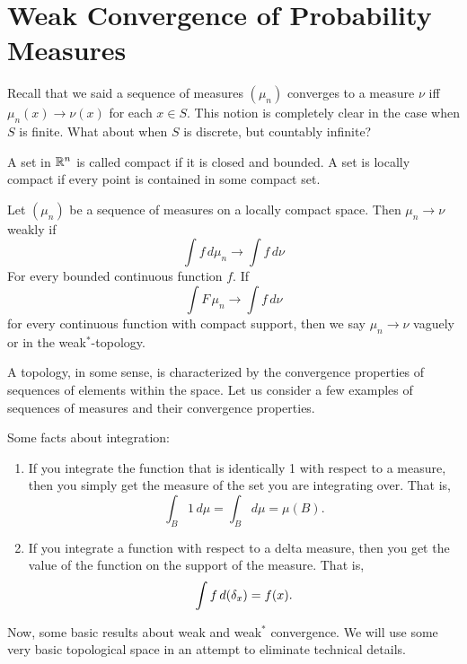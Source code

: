 

\section{Weak Convergence of Probability Measures}
\label{organized:weak-convergence}


Recall that we said a sequence of measures $(\mu_n)$ converges to
a measure $\nu$ if{f} $\mu_n(x) \to \nu(x)$ for each $x \in S$.  
This notion is completely clear in the case when $S$ is finite.  What about when $S$ is discrete, but countably infinite?

\begin{definition}   \label{defn:3.4}
A set in $\mathbb{R}^n$ is called compact if it is closed and bounded.  
A set is locally compact if every point is contained in some compact set.
\end{definition}

\begin{definition}   \label{defn:3.5}
Let $(\mu_n)$ be a sequence of measures on a locally compact space.  
Then $\mu_n \to \nu$ weakly if
\[
     \int f\, d\mu_n \to \int f\, d\nu
\]
For every bounded continuous function $f$.  If
\[
     \int F\, \mu_n \to \int f\, d\nu
\]
for every continuous function with compact support, then we say $\mu_n \to \nu$ vaguely or in the weak$^*$-topology.
\end{definition}

A topology, in some sense, is characterized by the convergence
properties of sequences of elements within the space.  
Let us consider a few examples of sequences of measures and their convergence properties.

Some facts about integration:
\begin{enumerate}
\item[(1)] If you integrate the function that is identically 1 with
     respect to a measure, then you simply get the measure of the set
     you are integrating over.  That is,
\[
     \int_B 1\, d\mu = \int_B d\mu = \mu(B).
\]

\item[(2)] If you integrate a function with respect to a delta measure, then you get the value of the function on the support of the measure.  
That is,
\[
     \int f\, d(\delta_x) = f(x).
\]
\end{enumerate}

Now, some basic results about weak and weak$^*$ convergence.  
We will use some very basic topological space in an attempt to eliminate technical details.

